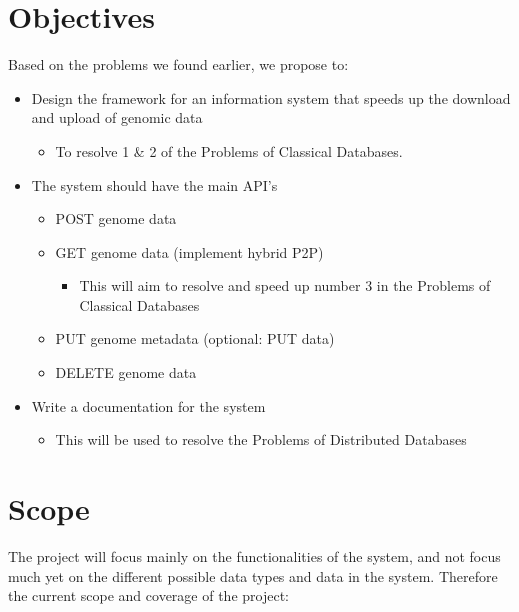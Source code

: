 \documentclass{article}
\begin{document}
\section{Objectives}


Based on the problems we found earlier, we propose to:

\begin{itemize}
    \item Design the framework for an information system that speeds up the download and upload of genomic data
    \begin{itemize}
        \item To resolve 1 \& 2 of the Problems of Classical Databases. 
    \end{itemize}
\end{itemize}

\begin{itemize}
    \item The system should have the main API’s
    \begin{itemize}
        \item POST genome data
        \item GET genome data (implement hybrid P2P)
        \begin{itemize}
            \item This will aim to resolve and speed up number 3 in the Problems of Classical Databases
        \end{itemize}
        \item PUT genome metadata (optional: PUT data)
        \item DELETE genome data
    \end{itemize}
    \item Write a documentation for the system
    \begin{itemize}
        \item This will be used to resolve the Problems of Distributed Databases
    \end{itemize}
\end{itemize}




\section{Scope}

The project will focus mainly on the functionalities of the system, and not focus much yet on the different possible data types and data in the system. Therefore the current scope and coverage of the project:
\end{document}
